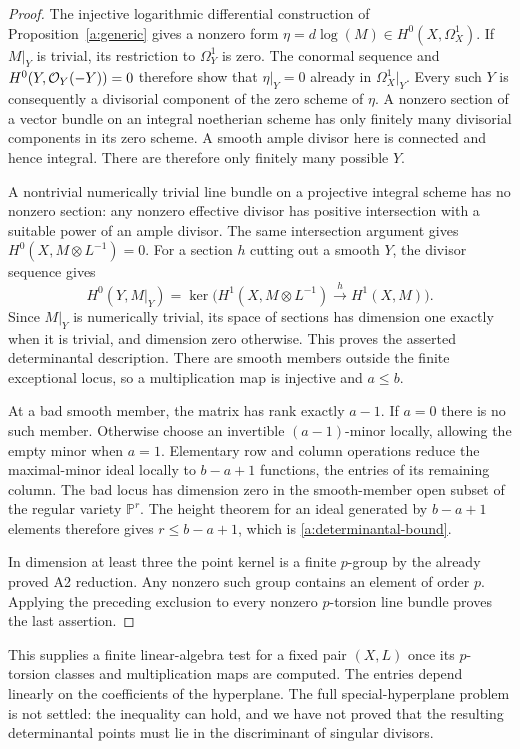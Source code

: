 \begin{proof}
The injective logarithmic differential construction of
Proposition~\ref{a:generic} gives a nonzero form
$\eta=d\log(M)\in H^0(X,\Omega_X^1)$.
If $M|_Y$ is trivial, its restriction to $\Omega_Y^1$ is zero.
The conormal sequence and
$H^0(Y,\mathcal O_Y(-Y))=0$ therefore show that
$\eta|_Y=0$ already in $\Omega_X^1|_Y$.
Every such $Y$ is consequently a divisorial component of the zero
scheme of $\eta$. A nonzero section of a vector bundle on an integral
noetherian scheme has only finitely many divisorial components in its
zero scheme. A smooth ample divisor here is connected and hence
integral. There are therefore only finitely many possible $Y$.

A nontrivial numerically trivial line bundle on a projective integral
scheme has no nonzero section: any nonzero effective divisor has
positive intersection with a suitable power of an ample divisor.
The same intersection argument gives $H^0(X,M\otimes L^{-1})=0$.
For a section $h$ cutting out a smooth $Y$, the divisor sequence gives
\[
 H^0(Y,M|_Y)=\ker\bigl(H^1(X,M\otimes L^{-1})
                  \xrightarrow{\,h\,}H^1(X,M)\bigr).
\]
Since $M|_Y$ is numerically trivial, its space of sections has dimension
one exactly when it is trivial, and dimension zero otherwise.
This proves the asserted determinantal description. There are smooth
members outside the finite exceptional locus, so a multiplication map
is injective and $a\leq b$.

At a bad smooth member, the matrix has rank exactly $a-1$.
If $a=0$ there is no such member. Otherwise choose an invertible
$(a-1)$-minor locally, allowing the empty minor when $a=1$.
Elementary row and column operations reduce the maximal-minor ideal
locally to $b-a+1$ functions, the entries of its remaining column.
The bad locus has dimension zero in the smooth-member open subset
of the regular variety $\mathbb P^r$. The height theorem for an ideal
generated by $b-a+1$ elements therefore gives $r\leq b-a+1$,
which is \eqref{a:determinantal-bound}.

In dimension at least three the point kernel is a finite $p$-group
by the already proved A2 reduction. Any nonzero such group contains
an element of order $p$. Applying the preceding exclusion to every
nonzero $p$-torsion line bundle proves the last assertion.
\end{proof}

This supplies a finite linear-algebra test for a fixed pair $(X,L)$
once its $p$-torsion classes and multiplication maps are computed.
The entries depend linearly on the coefficients of the hyperplane.
The full special-hyperplane problem is not settled: the inequality
can hold, and we have not proved that the resulting determinantal
points must lie in the discriminant of singular divisors.
